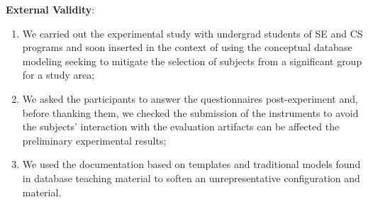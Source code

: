 \textbf{External Validity}: 
\begin{enumerate}[label=\roman*.]
    \item We carried out the experimental study with undergrad students of SE and CS programs and soon inserted in the context of using the conceptual database modeling seeking to mitigate the selection of subjects from a significant group for a study area; 
    \item We asked the participants to answer the questionnaires post-experiment and, before thanking them, we checked the submission of the instruments to avoid the subjects' interaction with the evaluation artifacts can be affected the preliminary experimental results; 
    \item We used the documentation based on templates and traditional models found in database teaching material to soften an unrepresentative configuration and material.
\end{enumerate}

